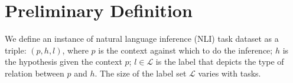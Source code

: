 \section{Preliminary Definition}
\label{sec:formulation}
We define an instance of natural language inference (NLI) task 
dataset as a triple:   $(p, h, l)$, 
where $p$ is the context against which to do the inference;
$h$ is the hypothesis given the context $p$; 
$l \in \mathcal{L}$ is the label that 
depicts the type of relation between $p$ and $h$. 
The size of the label set $\mathcal{L}$ varies with tasks. 



